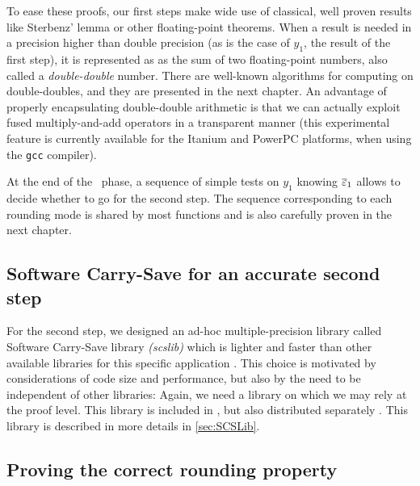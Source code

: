 To ease these proofs, our first steps make wide use of classical, well
proven results like Sterbenz' lemma or other floating-point theorems.
When a result is needed in a precision higher than double precision
(as is the case of $y_1$, the result of the first step), it is
represented as as the sum of two floating-point numbers, also called a
\emph{double-double} number.  There are well-known algorithms for
computing on double-doubles, and they are presented in the next
chapter. An advantage of properly encapsulating double-double
arithmetic is that we can actually exploit fused multiply-and-add
operators in a transparent manner (this experimental feature is
currently available for the Itanium and PowerPC platforms, when using
the \texttt{gcc} compiler).

At the end of the \quick\ phase, a sequence of simple tests on
$y_1$ knowing ${\overline{\varepsilon}}_1$ allows to decide whether to go for
the second step. The sequence corresponding to each rounding mode is
shared by most functions and is also carefully proven in the next
chapter.


\subsection{Software Carry-Save for an accurate second step}
For the second step, we designed an ad-hoc multiple-precision library
called Software Carry-Save library \emph{(scslib)} which is lighter
and faster than other available libraries for this specific
application \cite{DefDin2002,DinDef2003}. This choice is motivated by
considerations of code size and performance, but also by the need to
be independent of other libraries: Again, we need a library on which
we may rely at the proof level. This library is included in \crlibm,
but also distributed separately \cite{SCSweb}. This library is
described in more details in \ref{sec:SCSLib}.




\subsection{Proving the correct rounding property}

